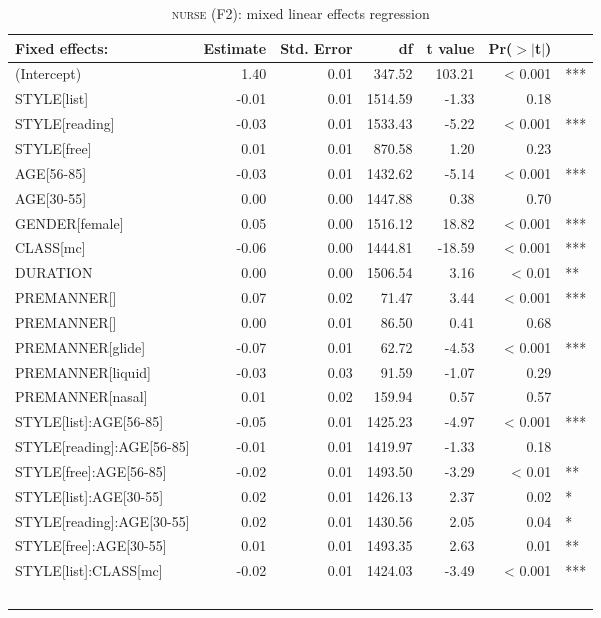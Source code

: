 {
	\footnotesize
	\begin{longtable}[c]{p{}rrrrrl}
		\caption{\textsc{nurse} (F2): mixed linear effects regression}\label{tab.regression.nurse.f2}\\
				
		\hline
		Fixed effects: & Estimate & Std. Error & df & t value & Pr($>$$|$t$|$) & \\ 
		\hline
		(Intercept) & 1.40 & 0.01 & 347.52 & 103.21 & < 0.001 & *** \\ 
		STYLE[list] & -0.01 & 0.01 & 1514.59 & -1.33 & 0.18 & \\ 
		STYLE[reading] & -0.03 & 0.01 & 1533.43 & -5.22 & < 0.001 & *** \\ 
		STYLE[free] & 0.01 & 0.01 & 870.58 & 1.20 & 0.23 & \\ 
		AGE[56-85] & -0.03 & 0.01 & 1432.62 & -5.14 & < 0.001 & *** \\ 
		AGE[30-55] & 0.00 & 0.00 & 1447.88 & 0.38 & 0.70 & \\ 
		GENDER[female] & 0.05 & 0.00 & 1516.12 & 18.82 & < 0.001 & *** \\ 
		CLASS[mc] & -0.06 & 0.00 & 1444.81 & -18.59 & < 0.001 & *** \\ 
		DURATION & 0.00 & 0.00 & 1506.54 & 3.16 & < 0.01 & ** \\ 
		PREMANNER[\isi{affricate}] & 0.07 & 0.02 & 71.47 & 3.44 & < 0.001 & *** \\ 
		PREMANNER[\isi{fricative}] & 0.00 & 0.01 & 86.50 & 0.41 & 0.68 & \\ 
		PREMANNER[glide] & -0.07 & 0.01 & 62.72 & -4.53 & < 0.001 & *** \\ 
		PREMANNER[liquid] & -0.03 & 0.03 & 91.59 & -1.07 & 0.29 & \\ 
		PREMANNER[nasal] & 0.01 & 0.02 & 159.94 & 0.57 & 0.57 & \\ 
		STYLE[list]:AGE[56-85] & -0.05 & 0.01 & 1425.23 & -4.97 & < 0.001 & *** \\ 
		STYLE[reading]:AGE[56-85] & -0.01 & 0.01 & 1419.97 & -1.33 & 0.18 & \\ 
		STYLE[free]:AGE[56-85] & -0.02 & 0.01 & 1493.50 & -3.29 & < 0.01 & ** \\ 
		STYLE[list]:AGE[30-55] & 0.02 & 0.01 & 1426.13 & 2.37 & 0.02 & * \\ 
		STYLE[reading]:AGE[30-55] & 0.02 & 0.01 & 1430.56 & 2.05 & 0.04 & * \\ 
		STYLE[free]:AGE[30-55] & 0.01 & 0.01 & 1493.35 & 2.63 & 0.01 & **\\ 
		STYLE[list]:CLASS[mc] & -0.02 & 0.01 & 1424.03 & -3.49 & < 0.001 & *** \\ 
$$
\end{longtable}}
